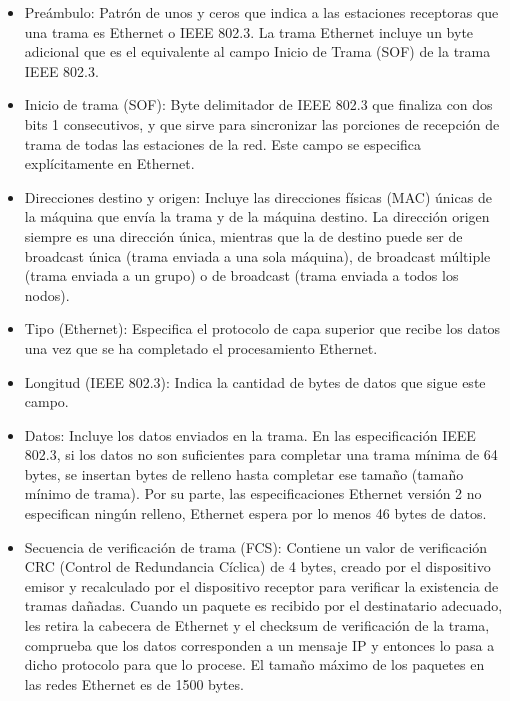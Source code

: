 \documentclass[a4paper]{article}
\begin{document}
	\begin{itemize}		
		\item Preámbulo: Patrón de unos y ceros que indica a las estaciones receptoras que una trama es Ethernet o IEEE 802.3. La trama Ethernet incluye un byte adicional que es el equivalente al campo Inicio de Trama (SOF) de la trama IEEE 802.3. 
		
		\item Inicio de trama (SOF): Byte delimitador de IEEE 802.3 que finaliza con dos bits 1 consecutivos, y que sirve para sincronizar las porciones de recepción de trama de todas las estaciones de la red. Este campo se especifica explícitamente en Ethernet. 
		
		\item Direcciones destino y origen: Incluye las direcciones físicas (MAC) únicas de la máquina que envía la trama y de la máquina destino. La dirección origen siempre es una dirección única, mientras que la de destino puede ser de broadcast única (trama enviada a una sola máquina), de broadcast múltiple (trama enviada a un grupo) o de broadcast (trama enviada a todos los nodos). 
		
		\item Tipo (Ethernet): Especifica el protocolo de capa superior que recibe los datos una vez que se ha completado el procesamiento Ethernet. 
		
		\item Longitud (IEEE 802.3): Indica la cantidad de bytes de datos que sigue este campo. 
		
		\item Datos: Incluye los datos enviados en la trama. En las especificación IEEE 802.3, si los datos no son suficientes para completar una trama mínima de 64 bytes, se insertan bytes de relleno hasta completar ese tamaño (tamaño mínimo de trama). Por su parte, las especificaciones Ethernet versión 2 no especifican ningún relleno, Ethernet espera por lo menos 46 bytes de datos. 
		
		\item Secuencia de verificación de trama (FCS): Contiene un valor de verificación CRC (Control de Redundancia Cíclica) de 4 bytes, creado por el dispositivo emisor y recalculado por el dispositivo receptor para verificar la existencia de tramas dañadas. 
		Cuando un paquete es recibido por el destinatario adecuado, les retira la cabecera de Ethernet y el checksum de verificación de la trama, comprueba que los datos corresponden a un mensaje IP y entonces lo pasa a dicho protocolo para que lo procese. El tamaño máximo de los paquetes en las redes Ethernet es de 1500 bytes.
		
	\end{itemize}
	
\end{document}
